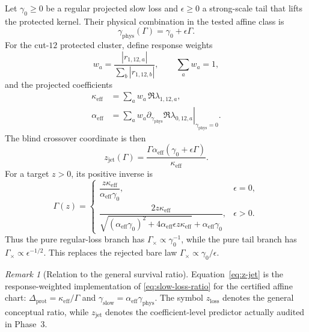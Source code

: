 \documentclass[11pt]{article}
\theoremstyle{definition}
\theoremstyle{remark}
\newtheorem{remark}[theorem]{Remark}
\begin{document}
Let $\gamma_0\ge0$ be a regular projected slow loss and $\epsilon\ge0$ a strong-scale tail that lifts the protected kernel.  Their physical combination in the tested affine class is
\begin{equation}
 \gamma_{\mathrm{phys}}(\Gamma)
 =\gamma_0+\epsilon\Gamma.
 \label{eq:physical-slow-loss}
\end{equation}
For the cut-$12$ protected cluster, define response weights
\begin{equation}
 w_a=\frac{|r_{1,12,a}|}{\sum_b|r_{1,12,b}|},
 \qquad \sum_aw_a=1,
 \label{eq:response-jet-weights}
\end{equation}
and the projected coefficients
\begin{align}
 \kappa_{\mathrm{eff}}
 &=\sum_aw_a\,\Re\lambda_{1,12,a},
 \label{eq:kappa-eff}\\
 \alpha_{\mathrm{eff}}
 &=\sum_aw_a
 \left.
 \partial_{\gamma_{\mathrm{phys}}}
 \Re\lambda_{0,12,a}
 \right|_{\gamma_{\mathrm{phys}}=0}.
 \label{eq:alpha-eff}
\end{align}
The blind crossover coordinate is then
\begin{equation}
 \boxed{
 z_{\mathrm{jet}}(\Gamma)
 =\frac{\Gamma\alpha_{\mathrm{eff}}
 (\gamma_0+\epsilon\Gamma)}{\kappa_{\mathrm{eff}}}.
 }
 \label{eq:z-jet}
\end{equation}
For a target $z>0$, its positive inverse is
\begin{equation}
 \Gamma(z)
 =
 \begin{cases}
 \dfrac{z\kappa_{\mathrm{eff}}}
 {\alpha_{\mathrm{eff}}\gamma_0},
 & \epsilon=0,\\[1.1em]
 \dfrac{2z\kappa_{\mathrm{eff}}}
 {\sqrt{(\alpha_{\mathrm{eff}}\gamma_0)^2
 +4\alpha_{\mathrm{eff}}\epsilon z\kappa_{\mathrm{eff}}}
 +\alpha_{\mathrm{eff}}\gamma_0},
 & \epsilon>0.
 \end{cases}
 \label{eq:z-jet-inverse}
\end{equation}
Thus the pure regular-loss branch has $\Gamma_\times\propto\gamma_0^{-1}$, while the pure tail branch has $\Gamma_\times\propto\epsilon^{-1/2}$.  This replaces the rejected bare law $\Gamma_\times\propto\gamma_0/\epsilon$.

\begin{remark}[Relation to the general survival ratio]
Equation~\eqref{eq:z-jet} is the response-weighted implementation of \eqref{eq:slow-loss-ratio} for the certified affine chart: $\Delta_{\mathrm{prot}}=\kappa_{\mathrm{eff}}/\Gamma$ and $\gamma_{\mathrm{slow}}=\alpha_{\mathrm{eff}}\gamma_{\mathrm{phys}}$.  The symbol $z_{\mathrm{loss}}$ denotes the general conceptual ratio, while $z_{\mathrm{jet}}$ denotes the coefficient-level predictor actually audited in Phase~3.
\end{remark}
\end{document}
